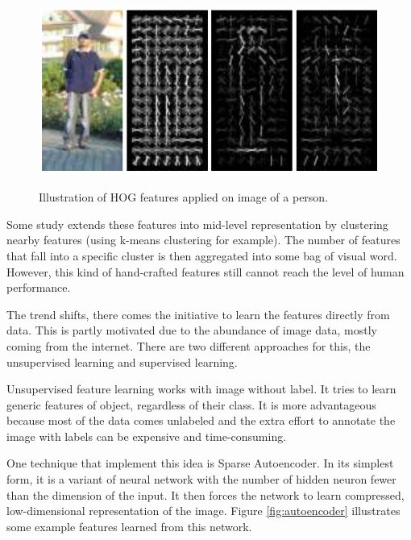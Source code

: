 \documentclass[a4paper,11pt]{kth-mag}
\begin{document}
\begin{figure}[h]
\centering
\includegraphics[scale=0.4]{image/hog.png}
\label{fig:hog}
\caption{Illustration of HOG features applied on image of a person.}
\end{figure}

Some study extends these features into mid-level representation by clustering nearby features (using k-means clustering for example). The number of features that fall into a specific cluster is then aggregated into some bag of visual word. However, this kind of hand-crafted features still cannot reach the level of human performance.

The trend shifts, there comes the initiative to learn the features directly from data. This is partly motivated due to the abundance of image data, mostly coming from the internet. There are two different approaches for this, the unsupervised learning and supervised learning.

Unsupervised feature learning works with image without label. It tries to learn generic features of object, regardless of their class. It is more advantageous because most of the data comes unlabeled and the extra effort to annotate the image with labels can be expensive and time-consuming.

One technique that implement this idea is Sparse Autoencoder. In its simplest form, it is a variant of neural network with the number of hidden neuron fewer than the dimension of the input. It then forces the network to learn compressed, low-dimensional representation of the image. Figure \ref{fig:autoencoder} illustrates some example features learned from this network.
\end{document}
